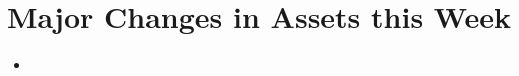 \documentclass{article}
\begin{document}
\section*{Major Changes in Assets this Week}
\begin{itemize}[label={--}]
    \item  
\end{itemize}

\end{document}
